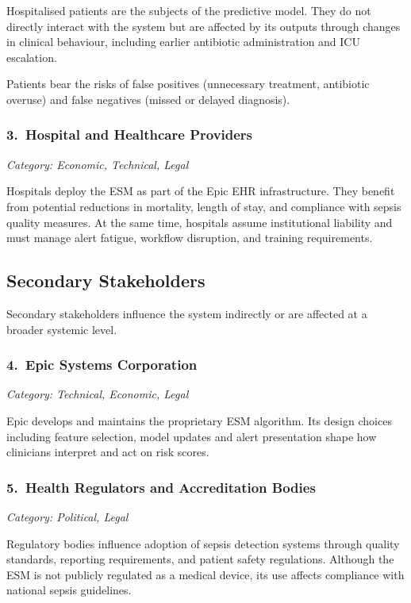 \documentclass[]{UCD_CS_41820_Report}
\begin{document}
Hospitalised patients are the subjects of the predictive model. They do not directly
interact with the system but are affected by its outputs through changes in clinical
behaviour, including earlier antibiotic administration and ICU escalation.

Patients bear the risks of false positives (unnecessary treatment, antibiotic overuse)
and false negatives (missed or delayed diagnosis).

\subsubsection*{3.\ Hospital and Healthcare Providers}
\textit{Category: Economic, Technical, Legal}

Hospitals deploy the ESM as part of the Epic EHR infrastructure. They benefit from
potential reductions in mortality, length of stay, and compliance with sepsis quality
measures. At the same time, hospitals assume institutional liability and must manage
alert fatigue, workflow disruption, and training requirements.

\subsection*{Secondary Stakeholders}

Secondary stakeholders influence the system indirectly or are affected at a broader
systemic level.

\subsubsection*{4.\ Epic Systems Corporation}
\textit{Category: Technical, Economic, Legal}

Epic develops and maintains the proprietary ESM algorithm. Its design choices
including feature selection, model updates and alert presentation shape how clinicians
interpret and act on risk scores.

\subsubsection*{5.\ Health Regulators and Accreditation Bodies}
\textit{Category: Political, Legal}

Regulatory bodies influence adoption of sepsis detection systems through quality
standards, reporting requirements, and patient safety regulations. Although the ESM
is not publicly regulated as a medical device, its use affects compliance with
national sepsis guidelines.
\end{document}
